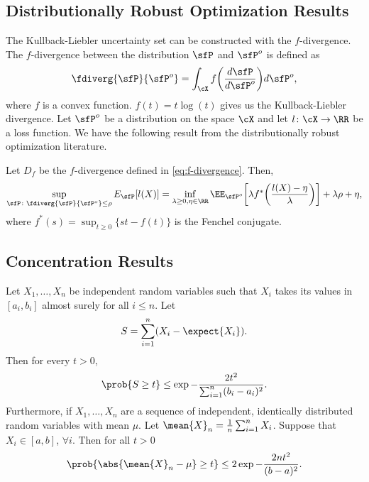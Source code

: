 \subsection{Distributionally Robust Optimization Results}
The Kullback-Liebler uncertainty set can be constructed with the $f$-divergence. The $f$-divergence between the distribution $\sfP$ and $\sfP^o$ is defined as
\begin{equation} \label{eq:f-divergence}
    \fdiverg{\sfP}{\sfP^o} = \int_{\cX} f\bigg(\frac{d\sfP}{d\sfP^o} \bigg)d\sfP^o,
\end{equation}
where $f$ is a convex function. $f(t)=t\log(t)$ gives us the Kullback-Liebler divergence. Let $\sfP^o$ be a distribution on the space $\cX$ and let $l\colon \cX\to\RR$ be a loss function. We have the following result from the distributionally robust optimization literature.
\begin{lemma}\label{lem:dual-reformulation-f-diverg}
    Let $D_f$ be the $f$-divergence defined in \cref{eq:f-divergence}. Then,
    \begin{equation}\label{eq:dual-reformulation-f-diverg}
        \sup_{\sfP\colon\fdiverg{\sfP}{\sfP^o}\leq\rho} E_{\sfP}[l(X)] = \inf_{\lambda\geq0,\eta\in\RR} \EE_{\sfP^o} \bigg[ \lambda f^*\bigg( \frac{l(X)-\eta}{\lambda}\bigg)\bigg] + \lambda\rho+\eta,
    \end{equation}
    where $f^*(s)=\sup_{t\geq0}\{st-f(t)\}$ is the Fenchel conjugate.
\end{lemma}


\subsection{Concentration Results}
\begin{lemma}\label{thm:hoeffding}
 Let $X_1,\dots,X_n$ be independent random variables such that $X_i$ takes its values in $[a_i,b_i]$ almost surely for all $i\leq n$. Let
 \begin{equation*}
     S=\sum_{i=1}^n(X_i-\expect{X_i}).
 \end{equation*}
 Then for every $t>0$,
 \begin{equation*}
     \prob{S\geq t}\leq\exp{-\frac{2t^2}{\sum_{i=1}^n(b_i-a_i)^2}}.
 \end{equation*}
 Furthermore, if $X_1,\dots,X_n$ are a sequence of independent, identically distributed random variables with mean $\mu$. Let $\mean{X}_n = \frac{1}{n}\sum_{i=1}^n X_i$. Suppose that $X_i\in[a,b]$, $\forall i$. Then for all $t>0$
\begin{equation*}
     \prob{\abs{\mean{X}_n - \mu} \geq t} \leq 2\exp{-\frac{2nt^2}{(b-a)^2}}.
\end{equation*}
\end{lemma}

